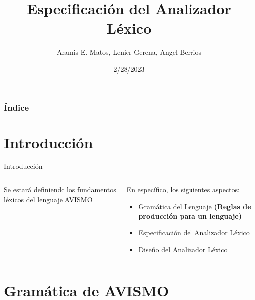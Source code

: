 \documentclass[14pt, aspectratio=169]{beamer}
\title{Especificación del Analizador Léxico}
\author{Aramis E. Matos, Lenier Gerena, Angel Berrios}
\date{2/28/2023}
\begin{document}
\maketitle
\begin{frame}[allowframebreaks]
    \frametitle{Índice}
    \begin{multicols}{2}
        \tableofcontents
    \end{multicols}
\end{frame}

\section{Introducción}

\begin{frame}{Introducción}
    \begin{columns}
        \begin{column}{0.5\textwidth}
            Se estará definiendo los fundamentos léxicos del lenguaje AVISMO \cite{narciso_farias_gramatica_2012}
        \end{column}
        \begin{column}{.5\textwidth}
            En específico, los siguientes aspectos:
            \begin{itemize}
                \item Gramática del Lenguaje \textbf{(Reglas de producción para un lenguaje)}
                \item Especificación del Analizador Léxico
                \item Diseño del Analizador Léxico
            \end{itemize}
        \end{column}
    \end{columns}

\end{frame}

\section{Gramática de AVISMO}
\end{document}

